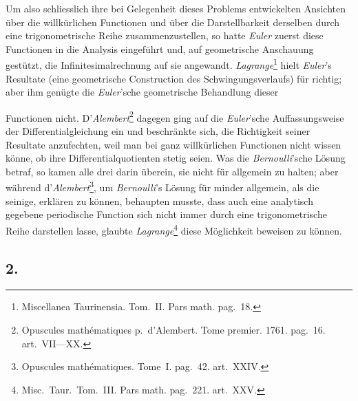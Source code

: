 \documentclass[12pt,a4paper]{book}
\theoremstyle{definition}
\theoremstyle{remark}
\begin{document}
Um also schliesslich ihre bei Gelegenheit dieses Problems entwickelten Ansichten über die willkürlichen Functionen und über die Darstellbarkeit derselben durch eine trigonometrische Reihe zusammenzustellen, so hatte \textit{Euler} zuerst diese Functionen in die Analysis eingeführt und, auf geometrische Anschauung gestützt, die Infinitesimalrechnung auf sie angewandt. \textit{Lagrange}\footnote{Miscellanea Taurinensia. Tom.~II. Pars math. pag.~18.} hielt \textit{Euler}'s Resultate (eine geometrische Construction des Schwingungsverlaufs) für richtig; aber ihm genügte die \textit{Euler}'sche geometrische Behandlung dieser

\newpage

Functionen nicht. D'\textit{Alembert}\footnote{Opuscules mathématiques p.\ d'Alembert. Tome premier. 1761. pag.~16. art.~VII---XX.} dagegen ging auf die \textit{Euler}'sche Auffassungsweise der Differentialgleichung ein und beschränkte sich, die Richtigkeit seiner Resultate anzufechten, weil man bei ganz willkürlichen Functionen nicht wissen könne, ob ihre Differentialquotienten stetig seien. Was die \textit{Bernoulli}'sche Lösung betraf, so kamen alle drei darin überein, sie nicht für allgemein zu halten; aber während d'\textit{Alembert}\footnote{Opuscules mathématiques. Tome~I. pag.~42. art.~XXIV.}, um \textit{Bernoulli}'s Lösung für minder allgemein, als die seinige, erklären zu können, behaupten musste, dass auch eine analytisch gegebene periodische Function sich nicht immer durch eine trigonometrische Reihe darstellen lasse, glaubte \textit{Lagrange}\footnote{Misc.\ Taur.\ Tom.~III. Pars math. pag.~221. art.~XXV.} diese Möglichkeit beweisen zu können.

\subsection*{2.}
\end{document}
